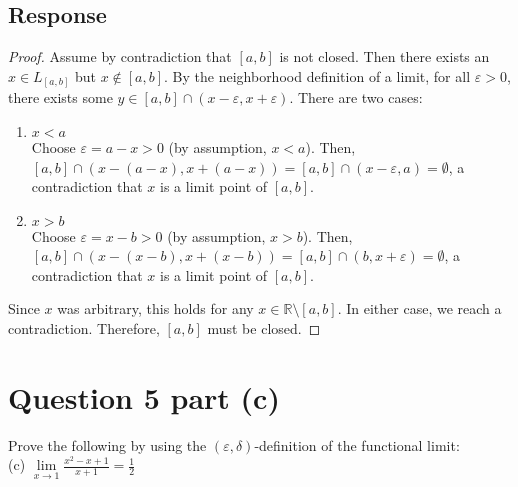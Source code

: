 \documentclass[13pt]{article}
\begin{document}
\subsection*{Response}
\begin{proof}
  Assume by contradiction that $[a, b]$ is not closed. Then there
  exists an $x \in L_{[a, b]}$ but $x \not\in [a, b]$. By the
  neighborhood definition of a limit, for all $\varepsilon > 0$, there
  exists some $y \in [a, b] \cap (x - \varepsilon, x +
  \varepsilon)$. There are two cases: 
  \begin{enumerate}[label=\textit{\textbf{Case \Roman*:}}]
  \item $x < a$ \\
    Choose $\varepsilon = a - x > 0$ (by assumption, $x <
    a$). Then, $[a, b] \cap \left(x - (a - x), x + (a - x)\right)
    = [a, b] \cap \left(x - \varepsilon, a\right) = \emptyset$, a
    contradiction that $x$ is a limit point of $[a, b]$.
  \item $x > b$ \\
    Choose $\varepsilon = x - b > 0$ (by assumption,
    $x > b$). Then, $[a, b] \cap (x - (x - b), x + (x - b))
    = [a, b] \cap (b, x + \varepsilon) = \emptyset$, a contradiction that $x$ is a
    limit point of $[a, b]$.
  \end{enumerate}
  Since $x$ was arbitrary, this holds for any $x \in \mathbb{R}
  \setminus [a, b]$. In either case, we reach a contradiction.
  Therefore, $[a, b]$ must be closed.
\end{proof}

\newpage
\section*{Question 5 part (c)}
Prove the following by using the $(\varepsilon, \delta)$-definition of
the functional limit: \\
(c) $\lim\limits_{x \to 1} \frac{x^2 - x + 1}{x + 1} = \frac{1}{2}$ \\ \\
\end{document}
